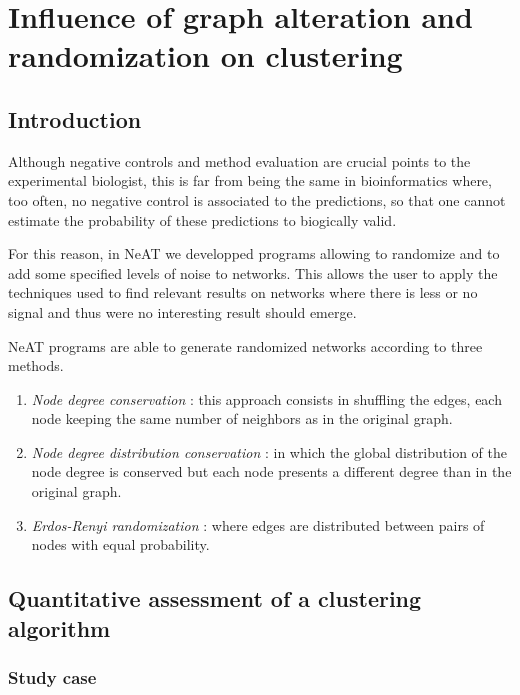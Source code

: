 \chapter{Influence of graph alteration and randomization on clustering}

\section{Introduction}
Although negative controls and method evaluation are crucial points to the experimental biologist, 
this is far from being the same in bioinformatics where, too often, no negative control is associated to 
the predictions, so that one cannot estimate the probability of these predictions to biogically valid.

For this reason, in NeAT we developped programs allowing to randomize and to add some specified levels of noise to networks. This allows the user to apply the techniques used to find relevant results on networks where there is less or no signal and thus were no interesting result should emerge.

NeAT programs are able to generate randomized networks according to three methods. 
\begin{enumerate}
 \item \textit{Node degree conservation} : this approach consists in shuffling the edges, each node keeping the same number of neighbors as in the original graph.
 \item \textit{Node degree distribution conservation} : in which the global distribution of the node degree is conserved but each node presents a different degree than in the original graph.
 \item \textit{Erdos-Renyi randomization} :  where edges are distributed between pairs of nodes with equal probability.
\end{enumerate}


\section{Quantitative assessment of a clustering algorithm}
\subsection{Study case}

